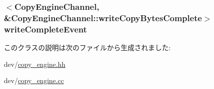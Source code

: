 \label{classCopyEngine_1_1CopyEngineChannel_a667d5cc444aa1980eba330fa927415d5}
\hypertarget{classCopyEngine_1_1CopyEngineChannel_a1008f08d5b6c9e1e72e6736909f23bbb}{
\subsubsection[{writeCompleteEvent}]{$<${\bf CopyEngineChannel}, \&CopyEngineChannel::writeCopyBytesComplete$>$ {\bf writeCompleteEvent}}}
\label{classCopyEngine_1_1CopyEngineChannel_a1008f08d5b6c9e1e72e6736909f23bbb}


このクラスの説明は次のファイルから生成されました:\begin{DoxyCompactItemize}
\item 
dev/\hyperlink{copy__engine_8hh}{copy\_\-engine.hh}\item 
dev/\hyperlink{copy__engine_8cc}{copy\_\-engine.cc}\end{DoxyCompactItemize}
